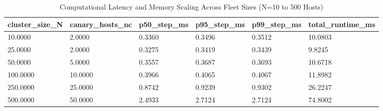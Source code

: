 \begin{table}[htbp]
\centering
\caption{Computational Latency and Memory Scaling Across Fleet Sizes (N=10 to 500 Hosts)}
\label{tab:table_T10_runtime_scaling}
\begin{tabular}{llllll}
\hline
cluster\_size\_N & canary\_hosts\_nc & p50\_step\_ms & p95\_step\_ms & p99\_step\_ms & total\_runtime\_ms \\
\hline
10.0000 & 2.0000 & 0.3360 & 0.3496 & 0.3512 & 10.0803 \\
25.0000 & 2.0000 & 0.3275 & 0.3419 & 0.3439 & 9.8245 \\
50.0000 & 5.0000 & 0.3557 & 0.3687 & 0.3693 & 10.6718 \\
100.0000 & 10.0000 & 0.3966 & 0.4065 & 0.4067 & 11.8982 \\
250.0000 & 25.0000 & 0.8742 & 0.9239 & 0.9302 & 26.2247 \\
500.0000 & 50.0000 & 2.4933 & 2.7124 & 2.7124 & 74.8002 \\
\hline
\end{tabular}
\end{table}
